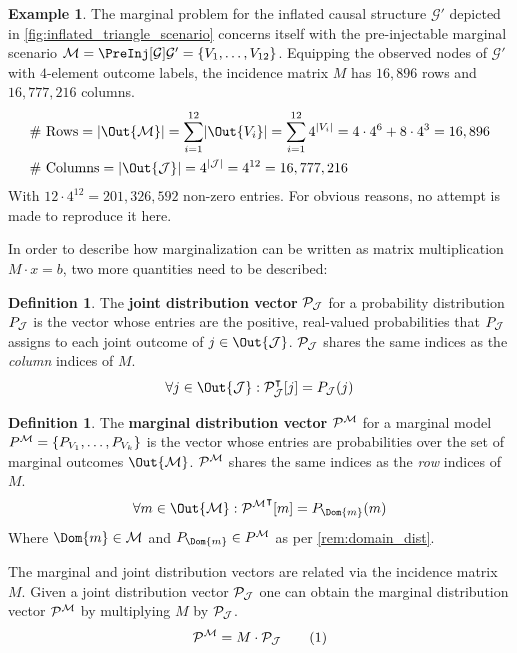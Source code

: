 \documentclass[aps, 10pt, english, twoside, pra, nofootinbib, longbibliography]{revtex4-1}
\theoremstyle{plain}
\theoremstyle{definition}
\newtheorem{definition}[theorem]{Definition}
\newtheorem{example}[theorem]{Example}
\theoremstyle{remark}
\newcommand{\graph}{\mathcal{G}}
\newcommand{\mscenario}{\mathcal{M}}
\newcommand{\jointvar}{\mathcal{J}}
\newcommand{\ts}{{\graph}}
\newcommand{\term}[1]{\textcolor{Mahogany}{\textbf{#1}}}
\begin{document}
    \begin{example}
        The marginal problem for the inflated causal structure $\ts'$ depicted in \cref{fig:inflated_triangle_scenario} concerns itself with the pre-injectable marginal scenario $\mscenario = \PreInj[\ts]{\ts'} = \bc{V_1, \ldots, V_{12}}$. Equipping the observed nodes of $\ts'$ with $4$-element outcome labels, the incidence matrix $M$ has $16,896$ rows and $16,777,216$ columns.
        \begin{align*}
            &\text{\# Rows} = \abs{\Out{\mscenario}} = \sum_{i=1}^{12} \abs{\Out{V_i}} = \sum_{i=1}^{12} 4^{\abs{V_i}} = 4 \cdot 4^6 + 8 \cdot 4^3 = 16,896 \\
            &\text{\# Columns} = \abs{\Out{\jointvar}} = 4^{\abs{\jointvar}} = 4^{12} = 16,777,216
        \end{align*}
        With $12 \cdot 4^{12} = 201,326,592$ non-zero entries. For obvious reasons, no attempt is made to reproduce it here.
    \end{example}

    In order to describe how marginalization can be written as matrix multiplication $M \cdot x = b$, two more quantities need to be described:

    \begin{definition}
        The \term{joint distribution vector} $\probvec[\jointvar]$ for a probability distribution $\prob[\jointvar]$ is the vector whose entries are the positive, real-valued probabilities that $\prob[\jointvar]$ assigns to each joint outcome of $j \in \Out{\jointvar}$. $\probvec[\jointvar]$ shares the same indices as the \textit{column} indices of $M$.
        \[ \forall j \in \Out{\jointvar} : \probvec[\jointvar]^\intercal\bs{j} = \prob[\jointvar][j] \]
    \end{definition}
    \begin{definition}
        The \term{marginal distribution vector} $\probvec^{\mscenario}$ for a marginal model $\prob^{\mscenario} = \bc{P_{V_1}, \ldots, P_{V_k}}$ is the vector whose entries are probabilities over the set of marginal outcomes $\Out{\mscenario}$. $\probvec^{\mscenario}$ shares the same indices as the \textit{row} indices of $M$.
        \[ \forall m \in \Out{\mscenario} : {\probvec^{\mscenario}}^\intercal\bs{m} = \prob[\Dom{m}][m] \]
        Where $\Dom{m} \in \mscenario$ and $\prob[\Dom{m}] \in \prob^{\mscenario}$ as per \cref{rem:domain_dist}.
    \end{definition}
    The marginal and joint distribution vectors are related via the incidence matrix $M$. Given a joint distribution vector $\probvec[\jointvar]$ one can obtain the marginal distribution vector $\probvec^{\mscenario}$ by multiplying $M$ by $\probvec[\jointvar]$.
    \[ \probvec^{\mscenario} = M \cdot \probvec[\jointvar] \eq \label{eq:marginal_problem_matrix} \]
\end{document}

